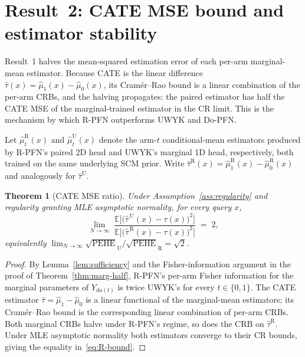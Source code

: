 \documentclass[11pt]{article}
\newtheorem{theorem}{Theorem}
\theoremstyle{remark}
\newcommand{\EE}{\mathbb{E}}
\begin{document}
\section{Result~2: CATE MSE bound and estimator stability}
\label{sec:cate-variance}

Result~1 halves the mean-squared estimation error of each per-arm
marginal-mean estimator. Because CATE is the linear difference
$\hat\tau(x) = \hat\mu_1(x) - \hat\mu_0(x)$, its Cram\'er--Rao bound
is a linear combination of the per-arm CRBs, and the halving
propagates: the paired estimator has half the CATE MSE of the
marginal-trained estimator in the CR limit. This is the mechanism by which R-PFN outperforms UWYK and Do-PFN.

Let $\hat\mu_t^{\mathrm{R}}(x)$ and $\hat\mu_t^{\mathrm{U}}(x)$ denote
the arm-$t$ conditional-mean estimators produced by R-PFN's paired
2D head and UWYK's marginal 1D head,
respectively, both trained on the same underlying SCM prior. Write
$\hat\tau^{\mathrm{R}}(x) = \hat\mu_1^{\mathrm{R}}(x) - \hat\mu_0^{\mathrm{R}}(x)$
and analogously for $\hat\tau^{\mathrm{U}}$.

\begin{theorem}[CATE MSE ratio]
\label{thm:variance-ratio}
Under Assumption~\ref{ass:regularity} and regularity granting MLE
asymptotic normality, for every query $x$,
\begin{equation}
  \lim_{N \to \infty}\;
  \frac{\EE\!\bigl[\bigl(\hat\tau^{\,\mathrm{U}}(x) - \tau(x)\bigr)^2\bigr]}
       {\EE\!\bigl[\bigl(\hat\tau^{\,\mathrm{R}}(x) - \tau(x)\bigr)^2\bigr]}
  \;=\; 2,
  \label{eq:R-bound}
\end{equation}
equivalently
$\lim_{N \to \infty} \sqrt{\mathrm{PEHE}}_{\mathrm{U}} / \sqrt{\mathrm{PEHE}}_{\mathrm{R}} = \sqrt{2}$.
\end{theorem}

\begin{proof}
By Lemma~\ref{lem:sufficiency} and the Fisher-information argument in
the proof of Theorem~\ref{thm:marg-half}, R-PFN's per-arm Fisher
information for the marginal parameters of $Y_{\mathrm{do}(t)}$ is
twice UWYK's for every $t \in \{0, 1\}$. The CATE estimator
$\hat\tau = \hat\mu_1 - \hat\mu_0$ is a linear functional of the
marginal-mean estimators; its Cram\'er--Rao bound is the corresponding
linear combination of per-arm CRBs. Both marginal CRBs halve under
R-PFN's regime, so does the CRB on $\hat\tau^{\mathrm{R}}$. Under MLE
asymptotic normality both estimators converge to their CR bounds,
giving the equality in~\eqref{eq:R-bound}.
\end{proof}
\end{document}
